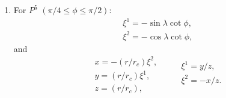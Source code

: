 \documentclass{report}
\begin{document}
\begin{enumerate}
\item For $P^5$ $\left(\pi/4 \leq \phi \leq \pi/2 \right)$:
\begin{equation} \label{eq:P5-sphere-to-cube}
    \begin{array}{l}
        \xi^1 = - \sin \lambda \cot \phi ,\\
        \xi^2 = - \cos \lambda \cot \phi , 
    \end{array}
\end{equation}
and
\begin{equation}\label{eq:P5-cube-to-global-and-vice-versa}
    \begin{array}{l}
        x = - (r/r_c) \xi^2,  \\
        y = (r/r_c) \xi^1,\\
        z = (r/r_c),
    \end{array}
    \qquad
    \begin{array}{l}
        \xi^1 = {y}/{z}, \\
        \xi^2 = -{x}/{z} .\\
    \end{array}
\end{equation}


\end{enumerate}
\end{document}
